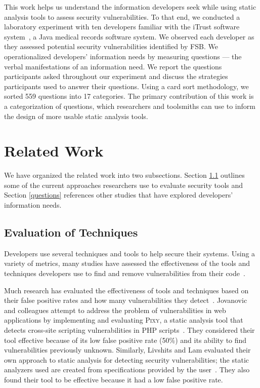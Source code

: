\documentclass{acm_proc_article-sp}
\begin{document}
This work helps us understand the information developers seek while using static analysis tools to assess security vulnerabilities.
To that end, we conducted a laboratory experiment with ten developers familiar with the iTrust software system~\cite{iTrust}, a Java medical records software system.
We observed each developer as they assessed potential security vulnerabilities identified by FSB. 
We operationalized developers' information needs by measuring questions --- the verbal manifestations of an information need. 
We report the questions participants asked throughout our experiment and discuss the strategies participants used to answer their questions.
Using a card sort methodology, we sorted 559 questions into 17 categories. 
The primary contribution of this work is a categorization of questions, which researchers and toolsmiths can use to inform the design of more usable static analysis tools.


\section{Related Work}
\label{sec:rw}

We have organized the related work into two subsections. 
Section \ref{evaluation} outlines some of the current approaches researchers use to evaluate security tools and Section \ref{questions} references other studies that have explored developers' information needs.

\subsection{Evaluation of Techniques}
\label{evaluation}
Developers use several techniques and tools to help secure their systems.
Using a variety of metrics, many studies have assessed the effectiveness of the tools and techniques developers use to find and remove vulnerabilities from their code~\cite{martin2005finding, austin2011one, livshits2005finding}.  

Much research has evaluated the effectiveness of tools and techniques based on their false positive rates and how many vulnerabilities they detect~\cite{jovanovic2006pixy, austin2011one, dukes2013case}. 
Jovanovic and colleagues attempt to address the problem of vulnerabilities in web applications by implementing and evaluating \textsc{Pixy}, a static analysis tool that detects cross-site scripting vulnerabilities in PHP scripts~\cite{jovanovic2006pixy}. 
They considered their tool effective because of its low false positive rate (50\%) and its ability to find vulnerabilities previously unknown. 
Similarly, Livshits and Lam evaluated their own approach to static analysis for detecting security vulnerabilities; the static analyzers used are created from specifications provided by the user~\cite{livshits2005finding}. 
They also found their tool to be effective because it had a low false positive rate. 
\end{document}
